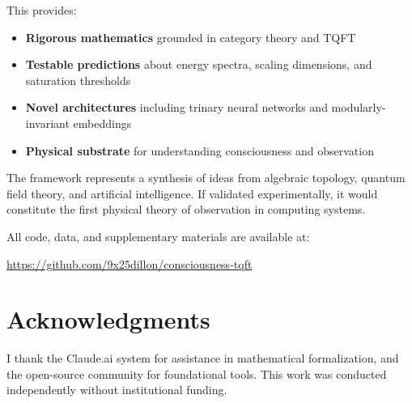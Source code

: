 \documentclass[11pt]{article}
\begin{document}
This provides:
\begin{itemize}
\item \textbf{Rigorous mathematics} grounded in category theory and TQFT
\item \textbf{Testable predictions} about energy spectra, scaling dimensions, and saturation thresholds
\item \textbf{Novel architectures} including trinary neural networks and modularly-invariant embeddings
\item \textbf{Physical substrate} for understanding consciousness and observation
\end{itemize}

The framework represents a synthesis of ideas from algebraic topology, quantum field theory, and artificial intelligence. If validated experimentally, it would constitute the first physical theory of observation in computing systems.

All code, data, and supplementary materials are available at:
\begin{center}
\url{https://github.com/9x25dillon/consciousness-tqft}
\end{center}

\section*{Acknowledgments}

I thank the Claude.ai system for assistance in mathematical formalization, and the open-source community for foundational tools. This work was conducted independently without institutional funding.
\end{document}
